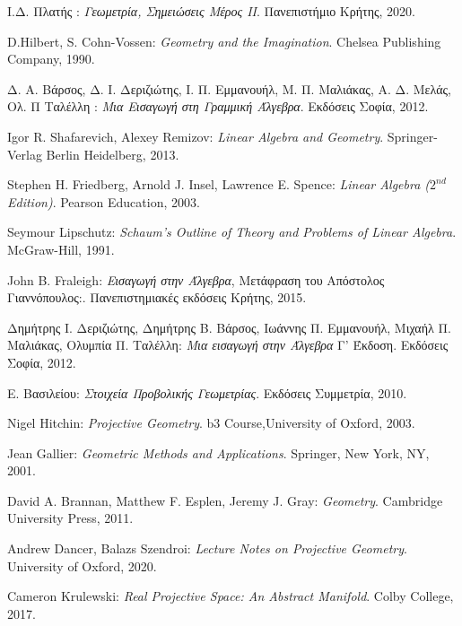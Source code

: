 \documentclass[12pt, a4paper]{book}
\begin{document}
\begin{thebibliography}{}



\bibitem{} 
Ι.Δ. Πλατής : 
\textit{Γεωμετρία, Σημειώσεις Μέρος ΙΙ}. 
Πανεπιστήμιο Κρήτης, 2020.

\bibitem{} 
\textlatin{D.Hilbert, S. Cohn-Vossen:
\textit{Geometry and the Imagination}. 
Chelsea Publishing Company, 1990.}


\bibitem{} 
Δ. Α. Βάρσος, Δ. Ι. Δεριζιώτης, Ι. Π. Εμμανουήλ, Μ. Π. Μαλιάκας, Α. Δ. Μελάς, Ολ. Π Ταλέλλη : 
\textit{Mια Εισαγωγή στη Γραμμική Άλγεβρα}.
Εκδόσεις Σοφία, 2012.

\bibitem{} 
\textlatin{Igor R. Shafarevich, Alexey Remizov:
\textit{Linear Algebra and Geometry}. 
Springer-Verlag Berlin Heidelberg, 2013.}

\bibitem{} 
\textlatin{Stephen H. Friedberg, Arnold J. Insel, Lawrence E. Spence:
\textit{Linear Algebra ($2^{nd}$ Edition)}. 
Pearson Education, 2003.}

\bibitem{} 
\textlatin{Seymour Lipschutz:
\textit{Schaum's Outline of Theory and Problems of Linear Algebra}. 
McGraw-Hill, 1991.}


\bibitem{} 
\textlatin{John B. Fraleigh}:
\textit{Εισαγωγή στην Άλγεβρα}, Μετάφραση του Απόστολος Γιαννόπουλος:. 
Πανεπιστημιακές εκδόσεις Κρήτης, 2015.
 
\bibitem{} 
Δημήτρης Ι. Δεριζιώτης, Δημήτρης Β. Βάρσος, Ιωάννης Π. Εμμανουήλ, Μιχαήλ Π. Μαλιάκας, Ολυμπία Π. Ταλέλλη: 
\textit{Μια εισαγωγή στην Άλγεβρα}  Γ' Έκδοση. 
Εκδόσεις Σοφία, 2012.


\bibitem{} 
Ε. Βασιλείου: 
\textit{Στοιχεία Προβολικής Γεωμετρίας}.
Εκδόσεις Συμμετρία, 2010.

\bibitem{} 
\textlatin{Nigel Hitchin:
\textit{Projective Geometry}. 
b3 Course,University of Oxford, 2003.}

\bibitem{} 
\textlatin{Jean Gallier:
\textit{Geometric Methods and Applications}. 
Springer, New York, NY,  2001.}

\bibitem{} 
\textlatin{David A. Brannan,  Matthew F. Esplen,  Jeremy J. Gray:
\textit{Geometry}. 
Cambridge University Press, 2011.}


\bibitem{} 
\textlatin{Andrew Dancer, Balazs Szendroi:
\textit{Lecture Notes on Projective Geometry}. 
University of Oxford, 2020.}


\bibitem{} 
\textlatin{Cameron Krulewski:
\textit{Real Projective Space: An Abstract Manifold}. 
Colby College, 2017.}



\end{thebibliography}
\end{document}
